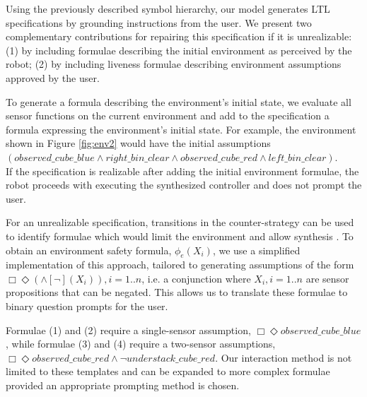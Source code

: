 \documentclass[letterpaper]{article} %
\begin{document}
Using the previously described symbol hierarchy, our model generates LTL specifications by grounding instructions from the user. We present two complementary contributions for repairing this specification if it is unrealizable: (1) by including formulae describing the initial environment as perceived by the robot; (2) by including liveness formulae describing environment assumptions approved by the user.

To generate a formula describing the environment's initial state, we evaluate all sensor functions on the current environment and add to the specification a formula expressing the environment's initial state. For example, the environment shown in Figure \ref{fig:env2} would have the initial assumptions $(observed\_cube\_blue \land right\_bin\_clear \land observed\_cube\_red \land left\_bin\_clear)$.\\
If the specification is realizable after adding the initial environment formulae, the robot proceeds with executing the synthesized controller and does not prompt the user.


For an unrealizable specification, transitions in the counter-strategy can be used to identify formulae which would limit the environment and allow synthesis \cite{alur2013counter}.
To obtain an environment safety formula, $\phi_e (X_i)$, we use a simplified implementation of this approach, tailored to generating assumptions of the form $\Box \Diamond (\land [\neg] ( X_i ) ),i=1..n$, i.e. a conjunction where ${X_i, i=1..n}$ are sensor propositions that can be negated. This allows us to translate these formulae to binary question prompts for the user.

Formulae (1) and (2) require a single-sensor assumption, $\Box \Diamond observed\_cube\_blue$ , while formulae (3) and (4) require a two-sensor assumptions, $\Box \Diamond observed\_cube\_red \land \neg understack\_cube\_red$.
Our interaction method is not limited to these templates and can be expanded to more complex formulae provided an appropriate prompting method is chosen.
\end{document}
